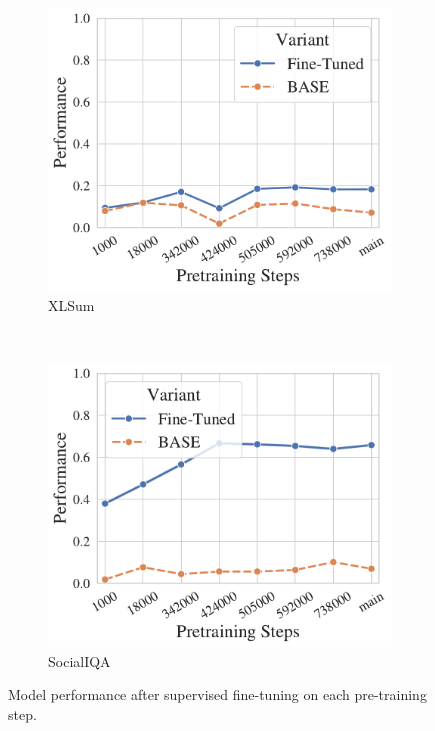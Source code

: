 \begin{figure}[t!]
\begin{subfigure}[b]{0.3\textwidth}
    \end{subfigure}%
    ~ 
    \begin{subfigure}[b]{0.3\textwidth}
    \includegraphics[width=\the\columnwidth]{figures/fig_files/ft_ckpts/sft_evalxsum-trainxsum.pdf}
        \caption{XLSum}
    \end{subfigure}%
    ~ 
    \begin{subfigure}[b]{0.3\textwidth}
    \includegraphics[width=\the\columnwidth]{figures/fig_files/ft_ckpts/sft_evalsocialiqa-trainsocialiqa.pdf}
        \caption{SocialIQA}
    \end{subfigure}%
    \caption{Model performance after supervised fine-tuning on each pre-training step.}
    \label{fig:sft-ckpt-perf}
\end{figure}